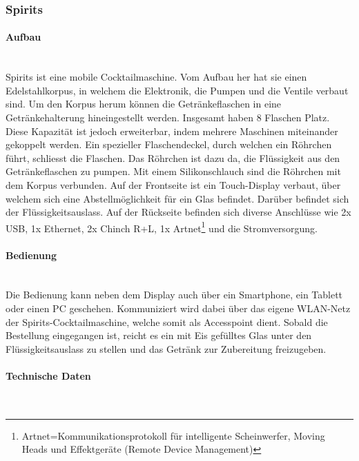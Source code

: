 \subsubsection{Spirits}\label{subsubsec:Spirits}
\paragraph{Aufbau}\label{subsubsec:Aufbau_Spirits}\mbox{}\\

Spirits ist eine mobile Cocktailmaschine. Vom Aufbau her hat sie einen Edelstahlkorpus, in welchem die Elektronik, die Pumpen und die Ventile verbaut sind. Um den Korpus herum können die Getränkeflaschen in eine Getränkehalterung hineingestellt werden. Insgesamt haben 8 Flaschen Platz. Diese Kapazität ist jedoch erweiterbar, indem mehrere Maschinen miteinander gekoppelt werden. Ein spezieller Flaschendeckel, durch welchen ein Röhrchen führt, schliesst die Flaschen. Das Röhrchen ist dazu da, die Flüssigkeit aus den Getränkeflaschen zu pumpen. Mit einem Silikonschlauch sind die Röhrchen mit dem Korpus verbunden. Auf der Frontseite ist ein Touch-Display verbaut, über welchem sich eine Abstellmöglichkeit für ein Glas befindet. Darüber befindet sich der Flüssigkeitsauslass. Auf der Rückseite befinden sich diverse Anschlüsse wie 2x USB, 1x Ethernet, 2x Chinch R+L, 1x Artnet\footnote{Artnet=Kommunikationsprotokoll für intelligente Scheinwerfer, Moving Heads und Effektgeräte (Remote Device Management)} und die Stromversorgung. \cite{koths_spirits_nodate}

\paragraph{Bedienung}\label{subsubsec:Bedienung_Spirits}\mbox{}\\

Die Bedienung kann neben dem Display auch über ein Smartphone, ein Tablett oder einen PC geschehen. Kommuniziert wird dabei über das eigene WLAN-Netz der Spirits-Cocktailmaschine, welche somit als Accesspoint dient. Sobald die Bestellung eingegangen ist, reicht es ein mit Eis gefülltes Glas unter den Flüssigkeitsauslass zu stellen und das Getränk zur Zubereitung freizugeben.\cite{koths_spirits_nodate}

\newpage


\paragraph{Technische Daten}\label{subsubsec:Technische_Daten_Spirits}\mbox{}\\

